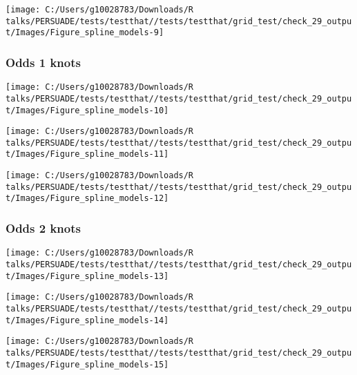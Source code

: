 \documentclass[
]{article}
\begin{document}
\begin{flushleft}\texttt{[image: C:/Users/g10028783/Downloads/R talks/PERSUADE/tests/testthat//tests/testthat/grid\_test/check\_29\_output/Images/Figure\_spline\_models-9]} \end{flushleft}

\clearpage

\subsubsection{Odds 1 knots}\label{odds-1-knots}

\begin{flushleft}\texttt{[image: C:/Users/g10028783/Downloads/R talks/PERSUADE/tests/testthat//tests/testthat/grid\_test/check\_29\_output/Images/Figure\_spline\_models-10]} \end{flushleft}

\begin{flushleft}\texttt{[image: C:/Users/g10028783/Downloads/R talks/PERSUADE/tests/testthat//tests/testthat/grid\_test/check\_29\_output/Images/Figure\_spline\_models-11]} \end{flushleft}

\begin{flushleft}\texttt{[image: C:/Users/g10028783/Downloads/R talks/PERSUADE/tests/testthat//tests/testthat/grid\_test/check\_29\_output/Images/Figure\_spline\_models-12]} \end{flushleft}

\clearpage

\subsubsection{Odds 2 knots}\label{odds-2-knots}

\begin{flushleft}\texttt{[image: C:/Users/g10028783/Downloads/R talks/PERSUADE/tests/testthat//tests/testthat/grid\_test/check\_29\_output/Images/Figure\_spline\_models-13]} \end{flushleft}

\begin{flushleft}\texttt{[image: C:/Users/g10028783/Downloads/R talks/PERSUADE/tests/testthat//tests/testthat/grid\_test/check\_29\_output/Images/Figure\_spline\_models-14]} \end{flushleft}

\begin{flushleft}\texttt{[image: C:/Users/g10028783/Downloads/R talks/PERSUADE/tests/testthat//tests/testthat/grid\_test/check\_29\_output/Images/Figure\_spline\_models-15]} \end{flushleft}
\end{document}

